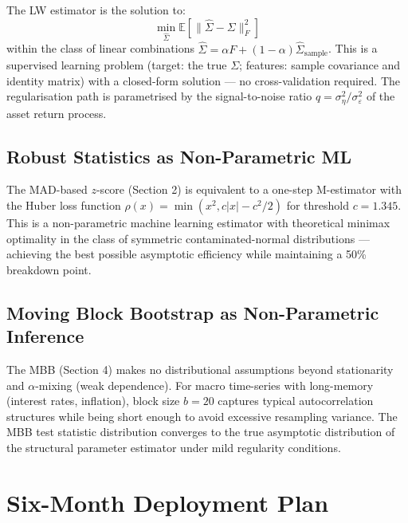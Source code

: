 \documentclass[11pt]{article}
\begin{document}
The LW estimator is the solution to:
\begin{equation}
\min_{\hat{\Sigma}} \mathbb{E}\left[\|\hat{\Sigma} - \Sigma\|_F^2\right]
\label{eq:lw-objective}
\end{equation}
within the class of linear combinations $\hat{\Sigma} = \alpha F + (1-\alpha)\hat{\Sigma}_{\text{sample}}$. This is a supervised learning problem (target: the true $\Sigma$; features: sample covariance and identity matrix) with a closed-form solution --- no cross-validation required. The regularisation path is parametrised by the signal-to-noise ratio $q = \sigma_\eta^2/\sigma_\varepsilon^2$ of the asset return process.

\subsection{Robust Statistics as Non-Parametric ML}

The MAD-based $z$-score (Section 2) is equivalent to a one-step M-estimator with the Huber loss function $\rho(x) = \min(x^2, c|x| - c^2/2)$ for threshold $c = 1.345$. This is a non-parametric machine learning estimator with theoretical minimax optimality in the class of symmetric contaminated-normal distributions --- achieving the best possible asymptotic efficiency while maintaining a 50\% breakdown point.

\subsection{Moving Block Bootstrap as Non-Parametric Inference}

The MBB (Section 4) makes no distributional assumptions beyond stationarity and $\alpha$-mixing (weak dependence). For macro time-series with long-memory (interest rates, inflation), block size $b=20$ captures typical autocorrelation structures while being short enough to avoid excessive resampling variance. The MBB test statistic distribution converges to the true asymptotic distribution of the structural parameter estimator under mild regularity conditions.

\section{Six-Month Deployment Plan}
\end{document}
